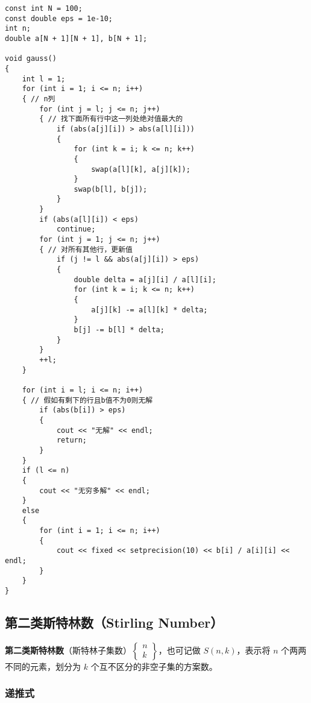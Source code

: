 \documentclass[]{article}
\begin{document}
\begin{verbatim}
const int N = 100;
const double eps = 1e-10;
int n;
double a[N + 1][N + 1], b[N + 1];

void gauss()
{
    int l = 1;
    for (int i = 1; i <= n; i++)
    { // n列
        for (int j = l; j <= n; j++)
        { // 找下面所有行中这一列处绝对值最大的
            if (abs(a[j][i]) > abs(a[l][i]))
            {
                for (int k = i; k <= n; k++)
                {
                    swap(a[l][k], a[j][k]);
                }
                swap(b[l], b[j]);
            }
        }
        if (abs(a[l][i]) < eps)
            continue;
        for (int j = 1; j <= n; j++)
        { // 对所有其他行，更新值
            if (j != l && abs(a[j][i]) > eps)
            {
                double delta = a[j][i] / a[l][i];
                for (int k = i; k <= n; k++)
                {
                    a[j][k] -= a[l][k] * delta;
                }
                b[j] -= b[l] * delta;
            }
        }
        ++l;
    }

    for (int i = l; i <= n; i++)
    { // 假如有剩下的行且b值不为0则无解
        if (abs(b[i]) > eps)
        {
            cout << "无解" << endl;
            return;
        }
    }
    if (l <= n)
    {
        cout << "无穷多解" << endl;
    }
    else
    {
        for (int i = 1; i <= n; i++)
        {
            cout << fixed << setprecision(10) << b[i] / a[i][i] << endl;
        }
    }
}
\end{verbatim}

\hypertarget{ux7b2cux4e8cux7c7bux65afux7279ux6797ux6570stirling-number}{%
\subsection{第二类斯特林数（Stirling
Number）}\label{ux7b2cux4e8cux7c7bux65afux7279ux6797ux6570stirling-number}}

\textbf{第二类斯特林数}（斯特林子集数）\(\begin{Bmatrix}n\\ k\end{Bmatrix}\)，也可记做
\(S(n,k)\)，表示将 \(n\) 个两两不同的元素，划分为 \(k​\)
个互不区分的非空子集的方案数。

\hypertarget{ux9012ux63a8ux5f0f}{%
\subsubsection{递推式}\label{ux9012ux63a8ux5f0f}}
\end{document}

